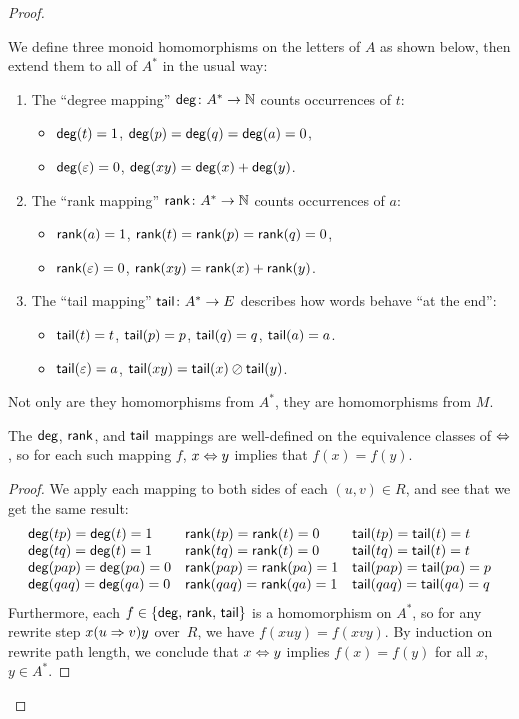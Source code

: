 \documentclass[../generics]{subfiles}
\begin{document}
\begin{proof}
\begin{definition}\label{def:deg rank tail}
We define three monoid homomorphisms on the letters of $A$ as shown below, then extend them to all of $A^*$ in the usual way:
\begin{enumerate}
\item The ``degree mapping'' $\mathsf{deg}\colon A^* \rightarrow \mathbb{N}$ counts occurrences of $t$:
\begin{itemize}
\item $\mathsf{deg}(t)=1$, $\mathsf{deg}(p)=\mathsf{deg}(q)=\mathsf{deg}(a)=0$,
\item $\mathsf{deg}(\varepsilon)=0$, $\mathsf{deg}(xy)=\mathsf{deg}(x)+\mathsf{deg}(y)$.
\end{itemize}
\item The ``rank mapping'' $\mathsf{rank}\colon A^* \rightarrow \mathbb{N}$ counts occurrences of $a$:
\begin{itemize}
\item $\mathsf{rank}(a)=1$, $\mathsf{rank}(t)=\mathsf{rank}(p)=\mathsf{rank}(q)=0$,
\item $\mathsf{rank}(\varepsilon)=0$, $\mathsf{rank}(xy)=\mathsf{rank}(x)+\mathsf{rank}(y)$.
\end{itemize}
\item The ``tail mapping'' $\mathsf{tail}\colon A^* \rightarrow E$ describes how words behave ``at the end'':
\begin{itemize}
\item $\mathsf{tail}(t)=t$, $\mathsf{tail}(p)=p$, $\mathsf{tail}(q)=q$, $\mathsf{tail}(a)=a$.
\item $\mathsf{tail}(\varepsilon)=a$, $\mathsf{tail}(xy)=\mathsf{tail}(x) \oslash \mathsf{tail}(y)$.
\end{itemize}
\end{enumerate}
\end{definition}

Not only are they homomorphisms from $A^*$, they are homomorphisms from $M$.

\begin{lemma}\label{lemma:tpqa well defined}
The $\mathsf{deg}$, $\mathsf{rank}$, and $\mathsf{tail}$ mappings are well-defined on the equivalence classes of $\Leftrightarrow$, so for each such mapping $f$, $x \Leftrightarrow y$ implies that $f(x)=f(y)$.
\end{lemma}
\begin{proof}
We apply each mapping to both sides of each $(u, v) \in R$, and see that we get the same result:
\[
\begin{array}{lll}
\mathsf{deg}(tp) = \mathsf{deg}(t) = 1 & \mathsf{rank}(tp) = \mathsf{rank}(t) = 0 & \mathsf{tail}(tp) = \mathsf{tail}(t) = t \\
\mathsf{deg}(tq) = \mathsf{deg}(t) = 1 & \mathsf{rank}(tq) = \mathsf{rank}(t) = 0 & \mathsf{tail}(tq) = \mathsf{tail}(t) = t \\
\mathsf{deg}(pap) = \mathsf{deg}(pa) = 0 & \mathsf{rank}(pap) = \mathsf{rank}(pa) = 1 & \mathsf{tail}(pap) = \mathsf{tail}(pa) = p \\
\mathsf{deg}(qaq) = \mathsf{deg}(qa) = 0 & \mathsf{rank}(qaq) = \mathsf{rank}(qa) = 1 & \mathsf{tail}(qaq) = \mathsf{tail}(qa) = q
\end{array}
\]
Furthermore, each $f \in \{\mathsf{deg},\, \mathsf{rank},\, \mathsf{tail}\}$ is a homomorphism on $A^*$, so for any rewrite step $x (u \Rightarrow v) y$ over~$R$, we have $f(xuy)=f(xvy)$. By induction on rewrite path length, we conclude that $x \Leftrightarrow y$ implies $f(x) = f(y)$ for all $x$, $y \in A^*$.
\end{proof}


\end{proof}
\end{document}

